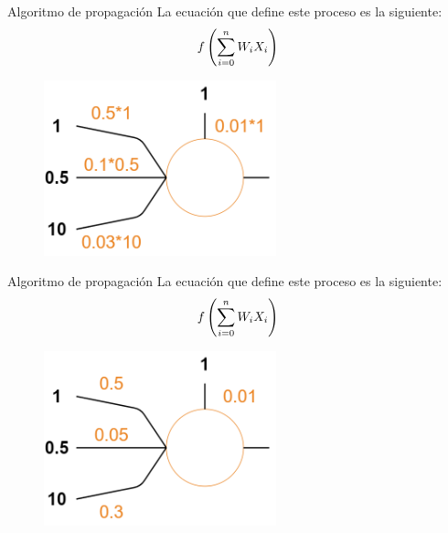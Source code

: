 \begin{frame}{Algoritmo de propagación}
La ecuación que define este \alert{proceso} es la siguiente:
\setcounter{equation}{0}
\begin{equation}
    \Large f\left(\sum_{i=0}^{n} W_{i} X_{i}\right)
\end{equation}

\begin{figure}
\centering
    \includegraphics[width=0.6\textwidth]{Slides/figures/Tema 3/PropagationExample_2.png}
\end{figure}
\end{frame}

\begin{frame}{Algoritmo de propagación}
La ecuación que define este \alert{proceso} es la siguiente:
\setcounter{equation}{0}
\begin{equation}
    \Large f\left(\sum_{i=0}^{n} W_{i} X_{i}\right)
\end{equation}

\begin{figure}
\centering
    \includegraphics[width=0.6\textwidth]{Slides/figures/Tema 3/PropagationExample_3.png}
\end{figure}
\end{frame}

